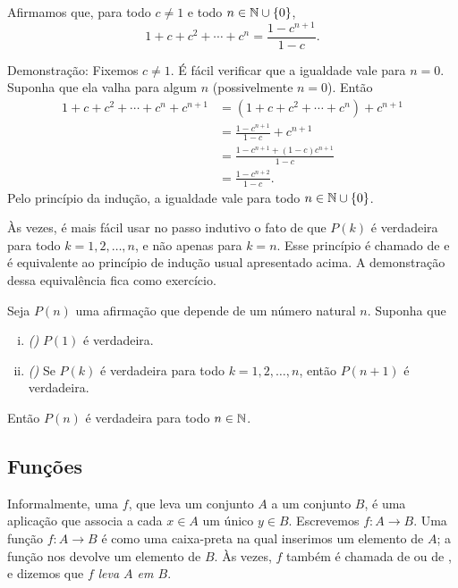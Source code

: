 \begin{example} \label{example:geometricsum}
Afirmamos que, para todo $c \neq 1$
e todo $n \in {\mathbb{N}} \cup \{ 0 \}$,
\begin{equation*}
1 + c + c^2 + \cdots + c^n = \frac{1-c^{n+1}}{1-c} .
\end{equation*}

Demonstração: Fixemos $c \neq 1$.
É fácil verificar que a igualdade vale para $n=0$.
Suponha que ela valha para algum $n$ (possivelmente $n=0$).
Então
\begin{equation*}
\begin{split}
1 + c + c^2 + \cdots + c^n + c^{n+1} & =
( 1 + c + c^2 + \cdots + c^n ) + c^{n+1} \\
& = \frac{1-c^{n+1}}{1-c}  + c^{n+1} \\
& = \frac{1-c^{n+1}  + (1-c)c^{n+1}}{1-c} \\
& = \frac{1-c^{n+2}}{1-c} .
\end{split}
\end{equation*}
Pelo princípio da indução, a igualdade vale para todo
$n \in {\mathbb{N}} \cup \{ 0 \}$.
\end{example}

Às vezes, é mais fácil usar no passo indutivo o fato de que
$P(k)$ é verdadeira para todo $k = 1,2,\ldots,n$, e não apenas para $k=n$.
Esse princípio é chamado de \emph{} e é
equivalente ao princípio de indução usual apresentado acima. A demonstração
dessa equivalência fica como exercício.

\begin{thm}
Seja $P(n)$ uma afirmação que depende de um número natural $n$. Suponha que
\begin{enumerate}[(i)]
\item \emph{()} $P(1)$ é verdadeira.
\item \emph{()} Se $P(k)$ é verdadeira para todo
$k = 1,2,\ldots,n$, então $P(n+1)$ é verdadeira.
\end{enumerate}
Então $P(n)$ é verdadeira para todo $n \in {\mathbb{N}}$.
\end{thm}

\subsection{Fun\c{c}\~oes}

Informalmente,
uma \emph{}
$f$, que leva um conjunto $A$ a um conjunto $B$,
\'e uma aplica\c{c}\~ao que associa a cada $x \in A$ um \'unico $y \in B$.
Escrevemos $f \colon A \to B$.
Uma fun\c{c}\~ao $f \colon A \to B$ é como uma caixa-preta na qual
inserimos um elemento de $A$; a fun\c{c}\~ao nos devolve um elemento de $B$.
Às vezes, $f$ tamb\'em é chamada de \emph{} ou de
\emph{}, e dizemos que $f$ \emph{leva $A$ em $B$}.

